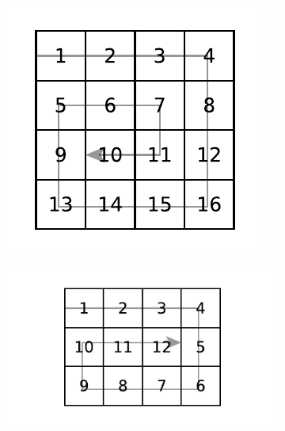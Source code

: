 \begin{figure}[t]
    \centering
    \begin{subfigure}[]{0.45\textwidth}
        \includegraphics[width=\textwidth]{sources/spiral_matrix/images/example1}
        \caption[]{}
        \label{fig:spiral_matrix:example1}
     \end{subfigure}
    \hfill
    \begin{subfigure}[]{0.45\textwidth}
        \includegraphics[width=\textwidth]{sources/spiral_matrix/images/example2}
        \caption[]{}
        \label{fig:spiral_matrix:example2}
    \end{subfigure}
\end{figure}



